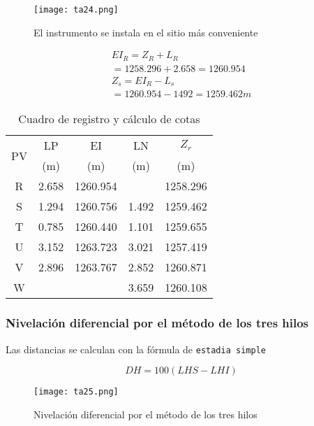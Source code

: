 \begin{figure}[h!]
  \centerline{\texttt{[image: ta24.png]}}
  \caption{El instrumento se instala en el sitio más conveniente}
  \label{ta24}
\end{figure}
\begin{align*}
    EI_R=Z_R+L_R\\
    =1258.296+2.658=1260.954\\
    Z_s=EI_R-L_s\\
    =1260.954-1492=1259.462m
\end{align*}
\begin{table}[h!]
    \centering\begin{tabular}{@{}ccccc@{}}
    \toprule
    \multirow{2}{*}{PV} & LP    & EI       & LN    & $Z_r$     \\ \cmidrule(l){2-5} 
                        & (m)   & (m)      & (m)   & (m)       \\ \midrule
    R                   & 2.658 & 1260.954 &       & 1258.296 \\
    S                   & 1.294 & 1260.756 & 1.492 & 1259.462  \\
    T                   & 0.785 & 1260.440 & 1.101 & 1259.655  \\
    U                   & 3.152 & 1263.723 & 3.021 & 1257.419  \\
    V                   & 2.896 & 1263.767 & 2.852 & 1260.871  \\
    W                   &       &          & 3.659 & 1260.108  \\ \bottomrule
    \end{tabular}
    \caption{Cuadro de registro y cálculo de cotas}
    \label{tabta6}
\end{table}

\subsubsection{Nivelación diferencial por el método de los tres hilos}

Las distancias se calculan con la fórmula de \texttt{estadia simple}

\begin{equation}
    DH=100\left(LHS-LHI\right)
\end{equation}

\begin{figure}[h!]
  \centerline{\texttt{[image: ta25.png]}}
  \caption{Nivelación diferencial por el método de los tres hilos}
  \label{ta25}
\end{figure}

